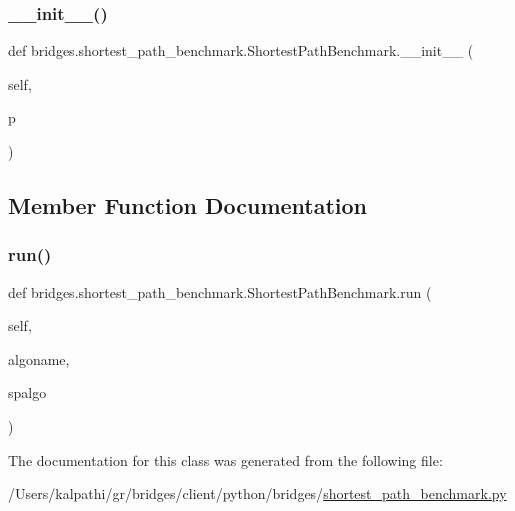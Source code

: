 \subsubsection{\texorpdfstring{\+\_\+\+\_\+init\+\_\+\+\_\+()}{\_\_init\_\_()}}
{\footnotesize\ttfamily def bridges.\+shortest\+\_\+path\+\_\+benchmark.\+Shortest\+Path\+Benchmark.\+\_\+\+\_\+init\+\_\+\+\_\+ (\begin{DoxyParamCaption}\item[{}]{self,  }\item[{}]{p }\end{DoxyParamCaption})}



\subsection{Member Function Documentation}
\mbox{\label{classbridges_1_1shortest__path__benchmark_1_1_shortest_path_benchmark_aba41366eff6ee3281ba4decd8d57b089}} 
\subsubsection{\texorpdfstring{run()}{run()}}
{\footnotesize\ttfamily def bridges.\+shortest\+\_\+path\+\_\+benchmark.\+Shortest\+Path\+Benchmark.\+run (\begin{DoxyParamCaption}\item[{}]{self,  }\item[{}]{algoname,  }\item[{}]{spalgo }\end{DoxyParamCaption})}



The documentation for this class was generated from the following file\+:\begin{DoxyCompactItemize}
\item 
/\+Users/kalpathi/gr/bridges/client/python/bridges/\mbox{\hyperlink{shortest__path__benchmark_8py}{shortest\+\_\+path\+\_\+benchmark.\+py}}\end{DoxyCompactItemize}
